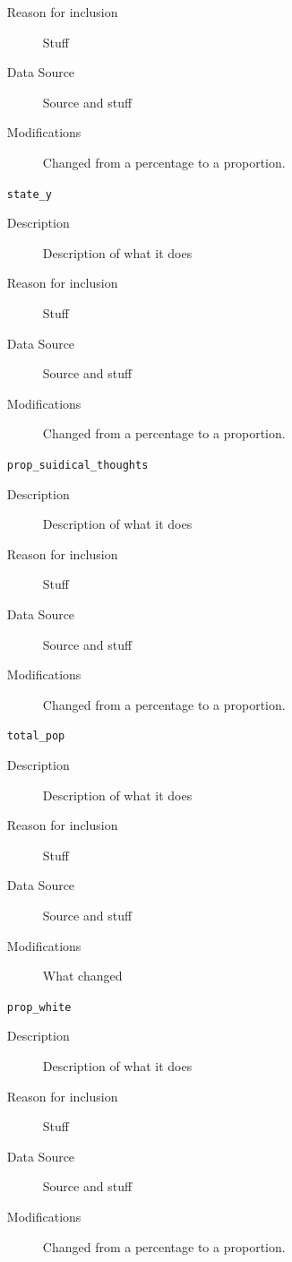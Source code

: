 \documentclass{article}
\begin{document}
\begin{itemize}[label={}, align=left]
\begin{description}
		      \item[Reason for inclusion] Stuff
		      \item[Data Source] Source and stuff
		      \item[Modifications] Changed from a percentage to a proportion.
	      \end{description}
	\item[\texttt{state\_y}] \
	      \begin{description}
		      \item[Description] Description of what it does
		      \item[Reason for inclusion] Stuff
		      \item[Data Source] Source and stuff
		      \item[Modifications] Changed from a percentage to a proportion.
	      \end{description}
	\item[\texttt{prop\_suidical\_thoughts}] \
	      \begin{description}
		      \item[Description] Description of what it does
		      \item[Reason for inclusion] Stuff
		      \item[Data Source] Source and stuff
		      \item[Modifications] Changed from a percentage to a proportion.
	      \end{description}
	\item[\texttt{total\_pop}] \
	      \begin{description}
		      \item[Description] Description of what it does
		      \item[Reason for inclusion] Stuff
		      \item[Data Source] Source and stuff
		      \item[Modifications] What changed
	      \end{description}
	\item[\texttt{prop\_white}] \
	      \begin{description}
		      \item[Description] Description of what it does
		      \item[Reason for inclusion] Stuff
		      \item[Data Source] Source and stuff
		      \item[Modifications] Changed from a percentage to a proportion.
	      \end{description}

\end{itemize}
\end{document}
